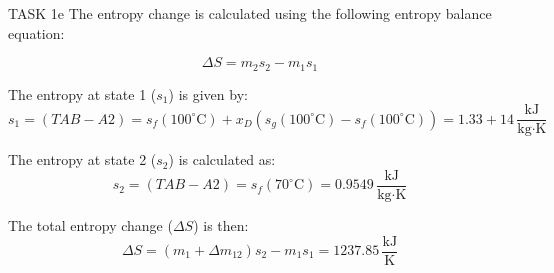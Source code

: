 TASK 1e  
The entropy change is calculated using the following entropy balance equation:  

\[
\Delta S = m_2 s_2 - m_1 s_1
\]

The entropy at state 1 (\(s_1\)) is given by:  
\[
s_1 = (TAB-A2) = s_f(100^\circ\text{C}) + x_D \left(s_g(100^\circ\text{C}) - s_f(100^\circ\text{C})\right) = 1.33 + 14 \, \frac{\text{kJ}}{\text{kg·K}}
\]

The entropy at state 2 (\(s_2\)) is calculated as:  
\[
s_2 = (TAB-A2) = s_f(70^\circ\text{C}) = 0.9549 \, \frac{\text{kJ}}{\text{kg·K}}
\]

The total entropy change (\(\Delta S\)) is then:  
\[
\Delta S = \left(m_1 + \Delta m_{12}\right) s_2 - m_1 s_1 = 1237.85 \, \frac{\text{kJ}}{\text{K}}
\]